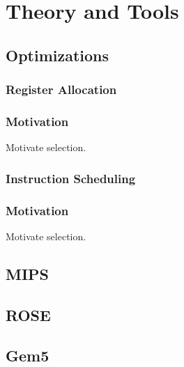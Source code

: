 \chapter{Theory and Tools}

\section{Optimizations}

\subsection{Register Allocation}

\subsection{Motivation}
Motivate selection.

\subsection{Instruction Scheduling}

\subsection{Motivation}
Motivate selection.

\section{MIPS}

\section{ROSE}

\section{Gem5}

